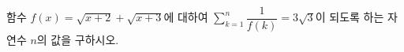 \hspace*{2mm}\begin{minipage}[t]{\dimexpr\linewidth-2mm\relax}\vspace{0pt}
함수 $f(x)=\sqrt{x+2}+\sqrt{x+3}$에 대하여 $\displaystyle\sum_{k=1}^{n}\dfrac{1}{f(k)}=3\sqrt{3}$이 되도록 하는 자연수 $n$의 값을 구하시오.\end{minipage}
